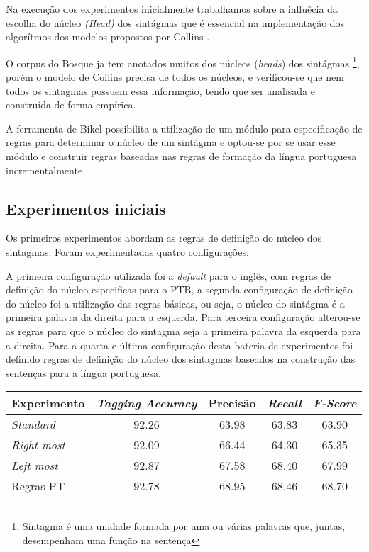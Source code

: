 
Na execução dos experimentos inicialmente trabalhamos sobre a influêcia da escolha do núcleo \emph{(Head)} dos sintágmas que é essencial na implementação dos algorítmos dos modelos propostos por Collins \cite{collins99}.

O corpus do Bosque ja tem anotados muitos dos núcleos (\emph{heads}) dos sintágmas \footnote{Sintagma é uma unidade formada por uma ou várias palavras que, juntas, desempenham uma função na sentença}, porém o modelo de Collins precisa de todos os núcleos, e verificou-se que nem todos os sintagmas possuem essa informação, tendo que ser analisada e construída de forma empírica.

A ferramenta de Bikel possibilita a utilização de um módulo para especificação de regras para determinar o núcleo de um sintágma e optou-se por se usar esse módulo e construir regras baseadas nas regras de formação da língua portuguesa incrementalmente.

\subsection{Experimentos iniciais}
\label{sec:configuracoes}

Os primeiros experimentos abordam as regras de definição do núcleo dos sintagmas. Foram experimentadas quatro configurações.

A primeira configuração utilizada foi a \emph{default} para o inglês, com regras de definição do núcleo especificas para o PTB, a segunda configuração de definição do núcleo foi a utilização das regras básicas, ou seja, o núcleo do sintágma é a primeira palavra da direita para a esquerda. Para terceira configuração alterou-se as regras para que o núcleo do sintagma seja a primeira palavra da esquerda para a direita. Para a quarta e última configuração desta bateria de experimentos foi definido regras de definição do núcleo dos sintagmas baseados na construção das sentenças para a língua portuguesa.


\begin{center}
   \footnotesize
	\begin{tabular}{|l|c|c|c|c|}
		\hline
		\textbf{Experimento} &  \textbf{\emph{Tagging Accuracy}} & \textbf{Precisão} & \textbf{\emph{Recall}} & \textbf{\emph{F-Score}} \\
		\hline
		\emph{Standard} & 92.26 & 63.98 & 63.83 & 63.90\\
		\hline		
		\emph{Right most} & 92.09 & 66.44 & 64.30 & 65.35\\
		\hline		
		\emph{Left most} & 92.87 & 67.58 & 68.40 & 67.99\\
		\hline		
		Regras PT & 92.78 & 68.95 & 68.46 & 68.70\\
		\hline
	\end{tabular}
	\label{tab:primeiro_experimento}
\end{center}


